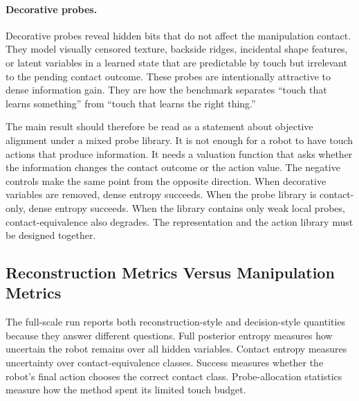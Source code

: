 \documentclass{article}
\begin{document}
\paragraph{Decorative probes.}
Decorative probes reveal hidden bits that do not affect the manipulation contact. They model visually censored texture, backside ridges, incidental shape features, or latent variables in a learned state that are predictable by touch but irrelevant to the pending contact outcome. These probes are intentionally attractive to dense information gain. They are how the benchmark separates ``touch that learns something'' from ``touch that learns the right thing.''

The main result should therefore be read as a statement about objective alignment under a mixed probe library. It is not enough for a robot to have touch actions that produce information. It needs a valuation function that asks whether the information changes the contact outcome or the action value. The negative controls make the same point from the opposite direction. When decorative variables are removed, dense entropy succeeds. When the probe library is contact-only, dense entropy succeeds. When the library contains only weak local probes, contact-equivalence also degrades. The representation and the action library must be designed together.

\subsection{Reconstruction Metrics Versus Manipulation Metrics}

The full-scale run reports both reconstruction-style and decision-style quantities because they answer different questions. Full posterior entropy measures how uncertain the robot remains over all hidden variables. Contact entropy measures uncertainty over contact-equivalence classes. Success measures whether the robot's final action chooses the correct contact class. Probe-allocation statistics measure how the method spent its limited touch budget.
\end{document}
